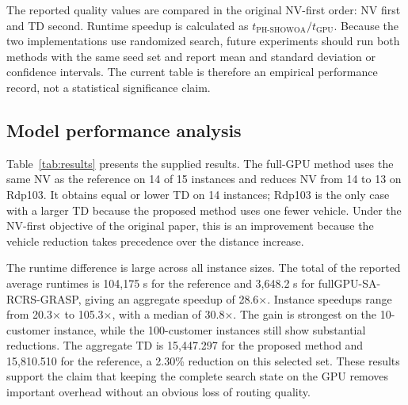 \documentclass[pdflatex,sn-mathphys-num]{sn-jnl}
\begin{document}
The reported quality values are compared in the original NV-first order: NV first and TD second. Runtime speedup is calculated as $t_{\mathrm{PH\mbox{-}SHOWOA}}/t_{\mathrm{GPU}}$. Because the two implementations use randomized search, future experiments should run both methods with the same seed set and report mean and standard deviation or confidence intervals. The current table is therefore an empirical performance record, not a statistical significance claim.

\subsection{Model performance analysis}\label{sec:performance}

Table~\ref{tab:results} presents the supplied results. The full-GPU method uses the same NV as the reference on 14 of 15 instances and reduces NV from 14 to 13 on Rdp103. It obtains equal or lower TD on 14 instances; Rdp103 is the only case with a larger TD because the proposed method uses one fewer vehicle. Under the NV-first objective of the original paper, this is an improvement because the vehicle reduction takes precedence over the distance increase.

The runtime difference is large across all instance sizes. The total of the reported average runtimes is 104,175 s for the reference and 3,648.2 s for fullGPU-SA-RCRS-GRASP, giving an aggregate speedup of 28.6$\times$. Instance speedups range from 20.3$\times$ to 105.3$\times$, with a median of 30.8$\times$. The gain is strongest on the 10-customer instance, while the 100-customer instances still show substantial reductions. The aggregate TD is 15,447.297 for the proposed method and 15,810.510 for the reference, a 2.30\% reduction on this selected set. These results support the claim that keeping the complete search state on the GPU removes important overhead without an obvious loss of routing quality.
\end{document}
